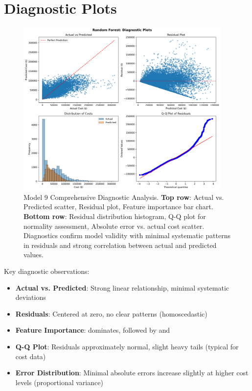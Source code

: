 \section{Diagnostic Plots}

\begin{figure}[h]
\centering
\includegraphics[width=0.95\textwidth]{models/model_9/diagnostic_plots.png}
\caption{Model 9 Comprehensive Diagnostic Analysis. \textbf{Top row}: Actual vs. Predicted scatter, Residual plot, Feature importance bar chart. \textbf{Bottom row}: Residual distribution histogram, Q-Q plot for normality assessment, Absolute error vs. actual cost scatter. Diagnostics confirm model validity with minimal systematic patterns in residuals and strong correlation between actual and predicted values.}
\label{fig:model9_diagnostics}
\end{figure}

Key diagnostic observations:
\begin{itemize}
    \item \textbf{Actual vs. Predicted}: Strong linear relationship, minimal systematic deviations
    \item \textbf{Residuals}: Centered at zero, no clear patterns (homoscedastic)
    \item \textbf{Feature Importance}: \ModelNineTopFeatureOne{} dominates, followed by \ModelNineTopFeatureTwo{} and \ModelNineTopFeatureThree{}
    \item \textbf{Q-Q Plot}: Residuals approximately normal, slight heavy tails (typical for cost data)
    \item \textbf{Error Distribution}: Minimal absolute errors increase slightly at higher cost levels (proportional variance)
\end{itemize}

